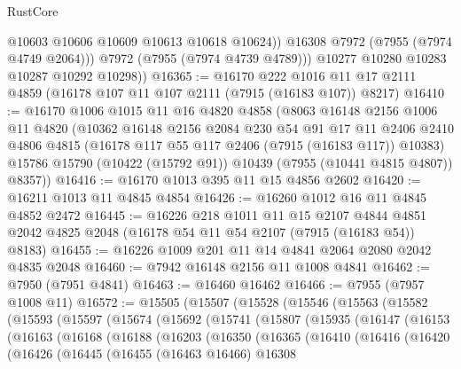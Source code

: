 \begin{lexlean}{RustCore}
\begin{coremodule}
                @10603
                @10606
                @10609
                @10613
                @10618
                @10624))
            @16308
            @7972
            (@7955 (@7974 @4749 @2064)))
          @7972
          (@7955 (@7974 @4739 @4789)))
        @10277
        @10280
        @10283
        @10287
        @10292
        @10298))
@16365 := @16170
    @222
    @1016
    @11
    @17
    @2111
    @4859
    (@16178 @107 @11 @107 @2111 (@7915 (@16183 @107)) @8217)
@16410 := @16170
    @1006
    @1015
    @11
    @16
    @4820
    @4858
    (@8063
      @16148
      @2156
      @1006
      @11
      @4820
      (@10362
        @16148
        @2156
        @2084
        @230
        @54
        @91
        @17
        @11
        @2406
        @2410
        @4806
        @4815
        (@16178 @117 @55 @117 @2406 (@7915 (@16183 @117)) @10383)
        @15786
        @15790
        (@10422 (@15792 @91))
        @10439
        (@7955 (@10441 @4815 @4807))
        @8357))
@16416 := @16170 @1013 @395 @11 @15 @4856 @2602
@16420 := @16211 @1013 @11 @4845 @4854
@16426 := @16260 @1012 @16 @11 @4845 @4852 @2472
@16445 := @16226
    @218
    @1011
    @11
    @15
    @2107
    @4844
    @4851
    @2042
    @4825
    @2048
    (@16178 @54 @11 @54 @2107 (@7915 (@16183 @54)) @8183)
@16455 := @16226 @1009 @201 @11 @14 @4841 @2064 @2080 @2042 @4835 @2048
@16460 := @7942 @16148 @2156 @11 @1008 @4841
@16462 := @7950 (@7951 @4841)
@16463 := @16460 @16462
@16466 := @7955 (@7957 @1008 @11)
@16572 := @15505
    (@15507
      (@15528
        (@15546
          (@15563
            (@15582
              (@15593
                (@15597
                  (@15674
                    (@15692
                      (@15741
                        (@15807
                          (@15935
                            (@16147
                              (@16153
                                (@16163
                                  (@16168
                                    (@16188
                                      (@16203
                                        (@16350
                                          (@16365
                                            (@16410
                                              (@16416
                                                (@16420
                                                  (@16426
                                                    (@16445
                                                      (@16455
                                                        (@16463 @16466)
                                                        @16308

\end{coremodule}
\end{lexlean}
